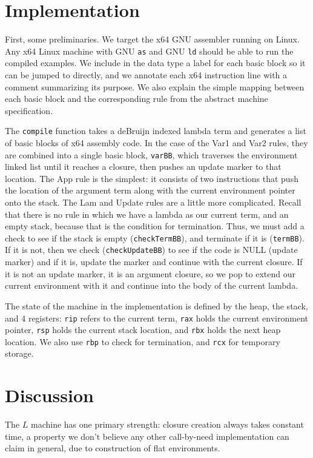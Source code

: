 \documentclass[preprint]{sigplanconf}
\begin{document}
\section{Implementation}\label{sec:impl}

First, some preliminaries. We target the x64 GNU assembler running on
Linux. Any x64 Linux machine with GNU \texttt{as} and GNU \texttt{ld} should
be able to run the compiled examples.  We include in the data type a label for
each basic block so it can be jumped to directly, and we annotate each x64
instruction line with a comment summarizing its purpose.  We also explain the
simple mapping between each basic block and the corresponding rule from the
abstract machine specification.

The \texttt{compile} function takes a deBruijn indexed lambda term and
generates a list of basic blocks of x64 assembly code. In the case of the Var1
and Var2 rules, they are combined into a single basic block, \texttt{varBB},
which traverses the environment linked list until it reaches a closure, then
pushes an update marker to that location. The App rule is the simplest: it
consists of two instructions that push the location of the argument term along
with the current environment pointer onto the stack. The Lam and Update rules
are a little more complicated.  Recall that there is no rule in which we have a
lambda as our current term, and an empty stack, because that is the condition
for termination. Thus, we must add a check to see if the stack is empty
(\texttt{checkTermBB}), and terminate if it is (\texttt{termBB}). If it is not,
then we check (\texttt{checkUpdateBB}) to see if the code is NULL (update
marker) and if it is, update the marker and continue with the current closure.
If it is not an update marker, it is an argument closure, so we pop to extend
our current environment with it and continue into the body of the current
lambda.

The state of the machine in the implementation is defined by the heap, the
stack, and 4 registers: \texttt{rip} refers to the current term, \texttt{rax}
holds the current environment pointer, \texttt{rsp} holds the current stack
location, and \texttt{rbx} holds the next heap location. We also use
\texttt{rbp} to check for termination, and \texttt{rcx} for temporary storage.



\section{Discussion}
The $L$ machine has one primary strength: closure creation always takes 
constant time, a property we don't believe any other call-by-need implementation
can claim in general, due to construction of flat environments.
\end{document}

